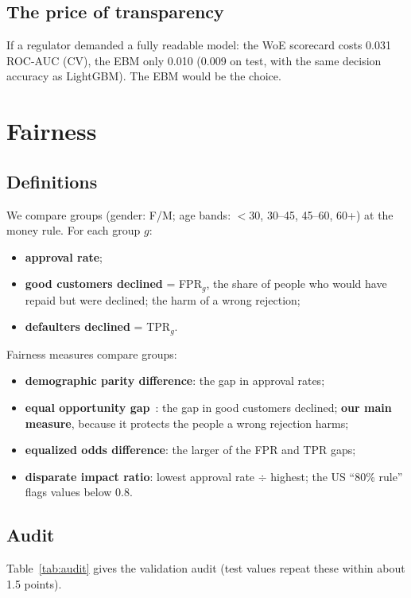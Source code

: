 \documentclass[conference,10pt]{IEEEtran}
\begin{document}
\subsection{The price of transparency}
If a regulator demanded a fully readable model: the WoE scorecard costs 0.031 ROC-AUC (CV), the
EBM only 0.010 (0.009 on test, with the same decision accuracy as LightGBM). The EBM would be the
choice.

\section{Fairness}
\label{sec:fair}

\subsection{Definitions}
We compare groups (gender: F/M; age bands: $<$30, 30--45, 45--60, 60+) at the money rule. For
each group $g$:
\begin{itemize}
\item \textbf{approval rate};
\item \textbf{good customers declined} = FPR$_g$, the share of people who would have repaid but
were declined; the harm of a wrong rejection;
\item \textbf{defaulters declined} = TPR$_g$.
\end{itemize}
Fairness measures compare groups:
\begin{itemize}
\item \textbf{demographic parity difference}: the gap in approval rates;
\item \textbf{equal opportunity gap}~\cite{hardt2016}: the gap in good customers declined;
\textbf{our main measure}, because it protects the people a wrong rejection harms;
\item \textbf{equalized odds difference}: the larger of the FPR and TPR gaps;
\item \textbf{disparate impact ratio}: lowest approval rate $\div$ highest; the US ``80\%
rule'' flags values below 0.8.
\end{itemize}

\subsection{Audit}
Table~\ref{tab:audit} gives the validation audit (test values repeat these within about
1.5 points).
\end{document}
